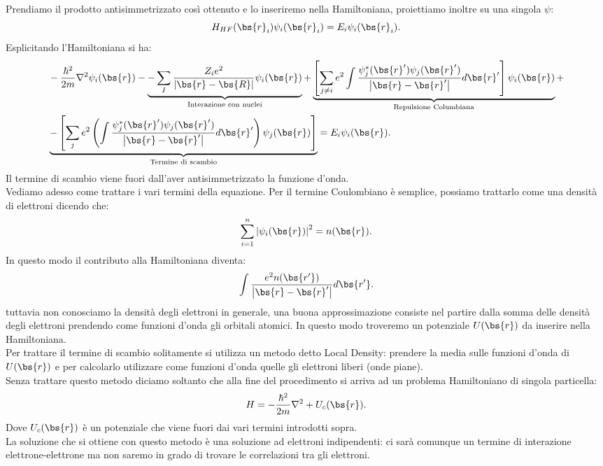 Prendiamo il prodotto antisimmetrizzato così ottenuto e lo inseriremo nella Hamiltoniana, proiettiamo inoltre su una singola $\psi$: 
\[
	H_{HF}(\bs{r}_i)\psi_i(\bs{r}_i) 
	=
	E_i \psi_i(\bs{r}_i)
.\] 
Esplicitando l'Hamiltoniana si ha:
\[\begin{aligned}
	&-\frac{\hbar^2}{2m}\nabla^2\psi_i(\bs{r}) -
%
	\underbrace{-\sum_{I}^{} 
		\frac{Z_i e^2}{\left| \bs{r}-\bs{R} \right| }
		\psi_i (\bs{r})}_
		{\text{Interazione con nuclei}} +
%
	\underbrace{
		\left[ \sum_{j\neq i}^{} 
		e^2\int
		\frac{\psi_j^*(\bs{r}')\psi_j(\bs{r}')}{\left| \bs{r}-\bs{r}' \right| }
		d \bs{r}' \right] \psi_i(\bs{r})}_
		{\text{Repulsione Columbiana}}+\\
%
	&\underbrace{
		-\left[ \sum_{j}^{} e^2\left( \int \frac{\psi_j^*(\bs{r}')
		\psi_j(\bs{r}')}{\left| \bs{r}-\bs{r}'\right|}d\bs{r}'\right)
		\psi_j(\bs{r})\right]}_
		{\text{Termine di scambio}} =
	E_i \psi_i(\bs{r})
.\end{aligned}\]
Il termine di scambio viene fuori dall'aver antisimmetrizzato la funzione d'onda.\\
Vediamo adesso come trattare i vari termini della equazione. Per il termine Coulombiano è semplice, possiamo trattarlo come una densità di elettroni dicendo che:
\[
	\sum_{i=1}^{n} \left| \psi_i(\bs{r}) \right| ^2=n(\bs{r})
.\] 
In questo modo il contributo alla Hamiltoniana diventa:
\[
	\int\frac{e^2n(\bs{r'})}{\left| \bs{r}-\bs{r}' \right| }d \bs{r'}
.\] 
tuttavia non conosciamo la densità degli elettroni in generale, una buona approssimazione consiste nel partire dalla somma delle densità degli elettroni prendendo come funzioni d'onda gli orbitali atomici. In questo modo troveremo un potenziale $U(\bs{r})$ da inserire nella Hamiltoniana. \\
Per trattare il termine di scambio solitamente si utilizza un metodo detto Local Density: prendere la media sulle funzioni d'onda di $U(\bs{r})$ e per calcolarlo utilizzare come funzioni d'onda quelle gli elettroni liberi (onde piane).\\
Senza trattare questo metodo diciamo soltanto che alla fine del procedimento si arriva ad un problema Hamiltoniano di singola particella:
\[
	H = -\frac{\hbar ^2}{2m}\nabla^2 + U_c(\bs{r})
.\] 
Dove $U_c(\bs{r})$ è un potenziale che viene fuori dai vari termini introdotti sopra.\\
La soluzione che si ottiene con questo metodo è una soluzione ad elettroni indipendenti: ci sarà comunque un termine di interazione elettrone-elettrone ma non saremo in grado di trovare le correlazioni tra gli elettroni.

